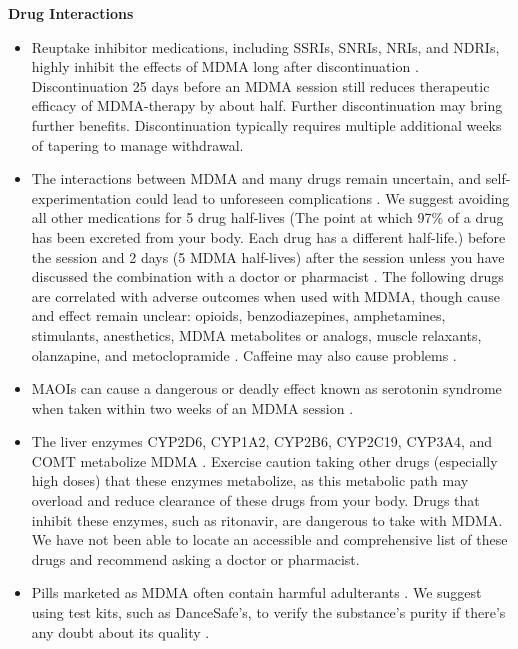 \documentclass[12pt,letterpaper]{article}
\begin{document}
\noindent \textbf{Drug Interactions}
\begin{itemize}
    \item Reuptake inhibitor medications, including SSRIs, SNRIs, NRIs, and NDRIs, highly inhibit the effects of MDMA long after discontinuation \cite{feducciaSSRIDiscontinuation}. Discontinuation 25 days before an MDMA session still reduces therapeutic efficacy of MDMA-therapy by about half. Further discontinuation may bring further benefits. Discontinuation typically requires multiple additional weeks of tapering to manage withdrawal.
    \item The interactions between MDMA and many drugs remain uncertain, and self-experimentation could lead to unforeseen complications \cite{cohenMDMADrugCombinations,sarparastDrugInteractions}. We suggest avoiding all other medications for 5 drug half-lives (The point at which 97\% of a drug has been excreted from your body. Each drug has a different half-life.) before the session and 2 days (5 MDMA half-lives) after the session unless you have discussed the combination with a doctor or pharmacist \cite{andradeHalf,torrePharmacology}. The following drugs are correlated with adverse outcomes when used with MDMA, though cause and effect remain unclear: opioids, benzodiazepines, amphetamines, stimulants, anesthetics, MDMA metabolites or analogs, muscle relaxants, olanzapine, and metoclopramide \cite{cohenMDMADrugCombinations}. Caffeine may also cause problems \cite{vanattouCaffeine}.
    \item MAOIs can cause a dangerous or deadly effect known as serotonin syndrome when taken within two weeks of an MDMA session \cite{malcolmSerotonin,edinoffInteractions}.
    \item The liver enzymes CYP2D6, CYP1A2, CYP2B6, CYP2C19, CYP3A4, and COMT metabolize MDMA \cite{torreEnzymes,sarparastDrugInteractions}. Exercise caution taking other drugs (especially high doses) that these enzymes metabolize, as this metabolic path may overload and reduce clearance of these drugs from your body. Drugs that inhibit these enzymes, such as ritonavir, are dangerous to take with MDMA. We have not been able to locate an accessible and comprehensive list of these drugs and recommend asking a doctor or pharmacist.
    \item Pills marketed as MDMA often contain harmful adulterants \cite{saleemiAdulterants}. We suggest using test kits, such as DanceSafe's, to verify the substance's purity if there's any doubt about its quality \cite{danceSafeTestingKit}.
\end{itemize}
\end{document}
